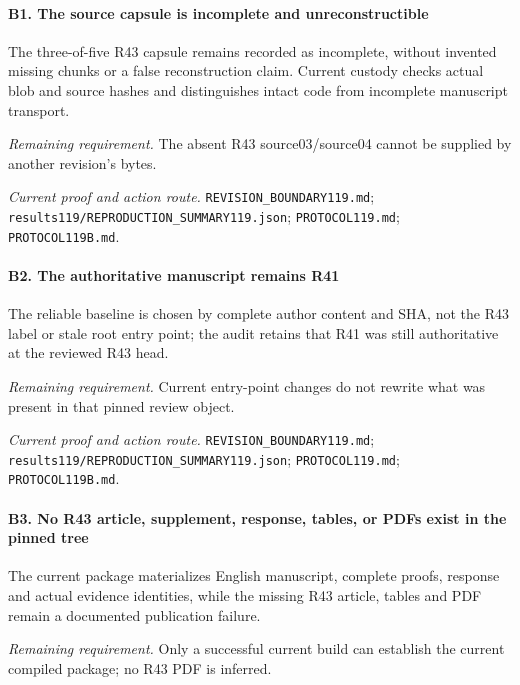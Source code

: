\paragraph{B1. The source capsule is incomplete and unreconstructible}

The three-of-five R43 capsule remains recorded as incomplete, without invented missing chunks or a false reconstruction claim. Current custody checks actual blob and source hashes and distinguishes intact code from incomplete manuscript transport.

\par\emph{Remaining requirement.} The absent R43 source03/source04 cannot be supplied by another revision's bytes.

\par\emph{Current proof and action route.} \nolinkurl{REVISION_BOUNDARY119.md}; \nolinkurl{results119/REPRODUCTION_SUMMARY119.json}; \nolinkurl{PROTOCOL119.md}; \nolinkurl{PROTOCOL119B.md}.

\paragraph{B2. The authoritative manuscript remains R41}

The reliable baseline is chosen by complete author content and SHA, not the R43 label or stale root entry point; the audit retains that R41 was still authoritative at the reviewed R43 head.

\par\emph{Remaining requirement.} Current entry-point changes do not rewrite what was present in that pinned review object.

\par\emph{Current proof and action route.} \nolinkurl{REVISION_BOUNDARY119.md}; \nolinkurl{results119/REPRODUCTION_SUMMARY119.json}; \nolinkurl{PROTOCOL119.md}; \nolinkurl{PROTOCOL119B.md}.

\paragraph{B3. No R43 article, supplement, response, tables, or PDFs exist in the pinned tree}

The current package materializes English manuscript, complete proofs, response and actual evidence identities, while the missing R43 article, tables and PDF remain a documented publication failure.

\par\emph{Remaining requirement.} Only a successful current build can establish the current compiled package; no R43 PDF is inferred.

